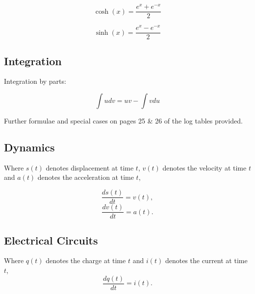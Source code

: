 \documentclass[a4paper,12pt]{article}
\begin{document}
	\begin{multicols}{2}
	\[ \cosh(x)  =  \frac{e^{x} + e^{-x}}{2} \]
	
	\[ \sinh(x)  = \frac{e^{x} - e^{-x}}{2} \]
	\end{multicols}

	
	

	\subsection*{Integration}
	
	Integration by parts: 
	
	\[ \int u dv = uv - \int v du \]  
	
\noindent Further formulae and special cases on pages 25 \& 26 of the log tables provided.
	
	\subsection*{Dynamics}
	Where $s(t)$ denotes displacement at time $t$, $v(t)$ denotes the velocity at time $t$ and $a(t)$
	denotes the acceleration at time $t$, 
	\begin{multicols}{2}
	\[  \frac{ds(t)}{dt}  = v(t),\]
	\[  \frac{dv(t)}{dt}  = a(t).\]
	\end{multicols}
	\subsection*{Electrical Circuits}
	Where $q(t)$ denotes the charge at time $t$ and $i(t)$ denotes the current at time $t$,
	\[  \frac{dq(t)}{dt}  = i(t).\]
	
	
\end{document}
